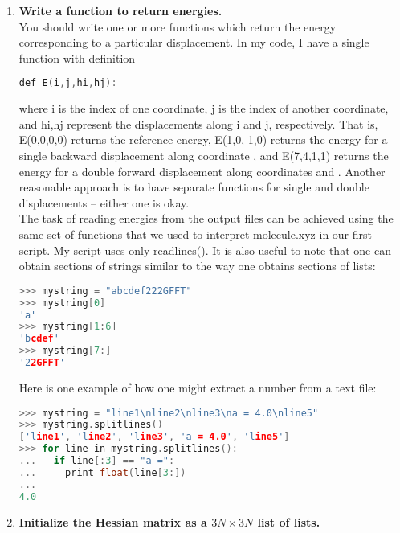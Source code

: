 \documentclass[11pt]{article}
\newcommand{\ttf}[1]{{\ttfamily #1}}
\begin{document}
\begin{enumerate}[label=\textbf{\arabic*}]
\item {\bf Write a function to return energies.}\\
You should write one or more functions which return the energy corresponding to a particular displacement.
In my code, I have a single function with definition
\begin{addmargin}{2cm}{}
\begin{lstlisting}[language=c++]
def E(i,j,hi,hj):
\end{lstlisting}
\end{addmargin}
where \ttf{i} is the index of one coordinate, \ttf{j} is the index of another coordinate, and \ttf{hi,hj} represent the displacements along \ttf{i} and \ttf{j}, respectively.
That is, \ttf{E(0,0,0,0)} returns the reference energy, \ttf{E(1,0,-1,0)} returns the energy for a single backward displacement along coordinate \ttf{1}, and \ttf{E(7,4,1,1)} returns the energy for a double forward displacement along coordinates \ttf{7} and \ttf{4}.
Another reasonable approach is to have separate functions for single and double displacements -- either one is okay.\\
The task of reading energies from the output files can be achieved using the same set of functions that we used to interpret \ttf{molecule.xyz} in our first script.
My script uses only \ttf{readlines()}.
It is also useful to note that one can obtain sections of strings similar to the way one obtains sections of lists:
\begin{addmargin}{2cm}{}
\begin{lstlisting}[language=c++]
>>> mystring = "abcdef222GFFT"
>>> mystring[0]
'a'
>>> mystring[1:6]
'bcdef'
>>> mystring[7:]
'22GFFT'
\end{lstlisting}
\end{addmargin}
Here is one example of how one might extract a number from a text file:
\begin{addmargin}{2cm}{}
\begin{lstlisting}[language=c++]
>>> mystring = "line1\nline2\nline3\na = 4.0\nline5"
>>> mystring.splitlines()
['line1', 'line2', 'line3', 'a = 4.0', 'line5']
>>> for line in mystring.splitlines():
...   if line[:3] == "a =":
...     print float(line[3:])
... 
4.0
\end{lstlisting}
\end{addmargin}
\item {\bf Initialize the Hessian matrix as a $3N\times3N$ \ttf{list} of \ttf{list}s.}\\

\end{enumerate}
\end{document}
